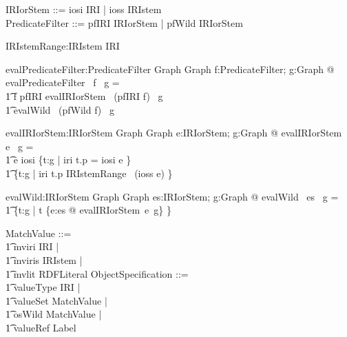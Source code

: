 \begin{zed}
IRIorStem ::= iosi \ldata IRI \rdata | ioss \ldata IRIstem \rdata \\
PredicateFilter ::= pfIRI \ldata IRIorStem \rdata | pfWild \ldata \power IRIorStem \rdata
\end{zed}
		

\begin{zed}
[IRIstem]
\end{zed}
		

\begin{gendef}
	IRIstemRange:IRIstem \pfun \power IRI
\end{gendef}
		

\begin{gendef}
   evalPredicateFilter:PredicateFilter \pfun Graph \pfun Graph
\where
   \forall f:PredicateFilter; g:Graph @ evalPredicateFilter~ f ~g = \\
\t1 \IF f \in \ran pfIRI \THEN evalIRIorStem~ (pfIRI \entryFor f)~ g \\
\t1 \ELSE evalWild~ (pfWild \entryFor f)~ g
\end{gendef}
		

\begin{gendef}
   evalIRIorStem:IRIorStem \pfun Graph \pfun Graph
\where
   \forall e:IRIorStem; g:Graph @ evalIRIorStem~ e ~g = \\
\t1 \IF e \in \ran iosi \THEN \{t:g | iri \entryFor t.p = iosi \entryFor e \} \\
\t1 \ELSE \{t:g | iri \entryFor t.p \in IRIstemRange~ (ioss \entryFor e) \}
\end{gendef}
		

\begin{gendef}
   evalWild:\power IRIorStem \pfun Graph \pfun Graph
\where
   \forall es:\power IRIorStem; g:Graph @ evalWild ~es ~g = \\
\t1 \{t:g | t \notin \bigcup \{e:es @ evalIRIorStem~e~g\} \}
\end{gendef}
		

\begin{zed}
MatchValue ::= \\
\t1	mviri \ldata IRI \rdata | \\
\t1	mviris \ldata IRIstem \rdata | \\
\t1 mvlit \ldata RDFLiteral \rdata
\also
ObjectSpecification ::= \\
\t1	valueType \ldata IRI \rdata | \\
\t1 valueSet \ldata \power MatchValue \rdata | \\
\t1 osWild \ldata \power MatchValue \rdata | \\
\t1 valueRef \ldata Label \rdata
\end{zed}
		

